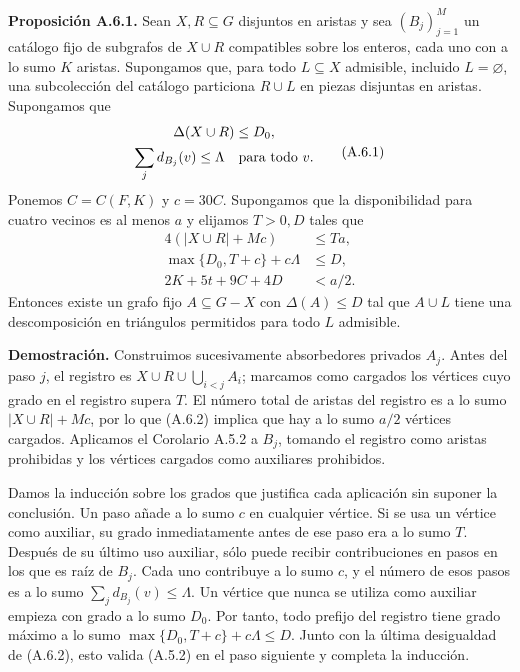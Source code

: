 \documentclass[spanish,11pt,a4paper]{article}
\begin{document}
\textbf{Proposición A.6.1.} Sean \(X,R\subseteq G\) disjuntos en aristas y sea \((B_j)_{j=1}^M\) un catálogo fijo de subgrafos de \(X\cup R\) compatibles sobre los enteros, cada uno con a lo sumo \(K\) aristas. Supongamos que, para todo \(L\subseteq X\) admisible, incluido \(L=\varnothing\), una subcolección del catálogo particiona \(R\cup L\) en piezas disjuntas en aristas. Supongamos que \[\begin{gathered}
\Delta(X\cup R)\le D_0,\\
\sum_j d_{B_j}(v)\le\Lambda\quad\hbox{para todo }v.
\end{gathered}
\tag{A.6.1}\] Ponemos \(C=C(F,K)\) y \(c=30C\). Supongamos que la disponibilidad para cuatro vecinos es al menos \(a\) y elijamos \(T>0,D\) tales que \[\begin{split}
4(|X\cup R|+Mc)&\le Ta,\\
\max\{D_0,T+c\}+c\Lambda&\le D,\\
2K+5t+9C+4D&<a/2.
\end{split}
\tag{A.6.2}\] Entonces existe un grafo fijo \(A\subseteq G-X\) con \(\Delta(A)\le D\) tal que \(A\cup L\) tiene una descomposición en triángulos permitidos para todo \(L\) admisible.

\textbf{Demostración.} Construimos sucesivamente absorbedores privados \(A_j\). Antes del paso \(j\), el registro es \(X\cup R\cup\bigcup_{i<j}A_i\); marcamos como cargados los vértices cuyo grado en el registro supera \(T\). El número total de aristas del registro es a lo sumo \(|X\cup R|+Mc\), por lo que (A.6.2) implica que hay a lo sumo \(a/2\) vértices cargados. Aplicamos el Corolario A.5.2 a \(B_j\), tomando el registro como aristas prohibidas y los vértices cargados como auxiliares prohibidos.

Damos la inducción sobre los grados que justifica cada aplicación sin suponer la conclusión. Un paso añade a lo sumo \(c\) en cualquier vértice. Si se usa un vértice como auxiliar, su grado inmediatamente antes de ese paso era a lo sumo \(T\). Después de su último uso auxiliar, sólo puede recibir contribuciones en pasos en los que es raíz de \(B_j\). Cada uno contribuye a lo sumo \(c\), y el número de esos pasos es a lo sumo \(\sum_j d_{B_j}(v)\le\Lambda\). Un vértice que nunca se utiliza como auxiliar empieza con grado a lo sumo \(D_0\). Por tanto, todo prefijo del registro tiene grado máximo a lo sumo \(\max\{D_0,T+c\}+c\Lambda\le D\). Junto con la última desigualdad de (A.6.2), esto valida (A.5.2) en el paso siguiente y completa la inducción.
\end{document}

